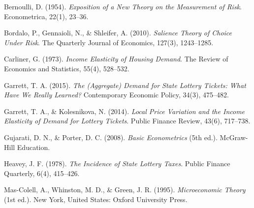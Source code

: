 \documentclass[11pt, oneside]{book}
\begin{document}
\begin{thebibliography}{111}







 Bernoulli, D. (1954). \textit{Exposition of a New Theory on the Measurement of Risk}. Econometrica, 22(1), 23–36.

 Bordalo, P., Gennaioli, N., \& Shleifer, A. (2010). \textit{Salience Theory of Choice Under Risk}. The Quarterly Journal of Economics, 127(3), 1243–1285.

 Carliner, G. (1973). \textit{Income Elasticity of Housing Demand}. The Review of Economics and Statistics, 55(4), 528–532.

 Garrett, T. A. (2015). \textit{The (Aggregate) Demand for State Lottery Tickets: What Have We Really Learned?} Contemporary Economic Policy, 34(3), 475–482.

 Garrett, T. A., \& Kolesnikova, N. (2014). \textit{Local Price Variation and the Income Elasticity of Demand for Lottery Tickets}. Public Finance Review, 43(6), 717–738.

 Gujarati, D. N., & Porter, D. C. (2008). \textit{Basic Econometrics} (5th ed.). McGraw-Hill Education.

 Heavey, J. F. (1978). \textit{The Incidence of State Lottery Taxes}. Public Finance Quarterly, 6(4), 415–426.

 Mas-Colell, A., Whinston, M. D., \& Green, J. R. (1995). \textit{Microeconomic Theory} (1st ed.). New York, United States: Oxford University Press.


\end{thebibliography}
\end{document}
